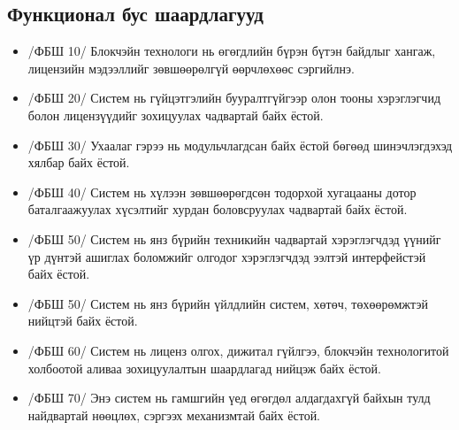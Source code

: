 \subsection{Функционал бус шаардлагууд}
\begin{itemize}
   \item[] /ФБШ 10/ Блокчэйн технологи нь өгөгдлийн бүрэн бүтэн байдлыг хангаж, лицензийн мэдээллийг зөвшөөрөлгүй өөрчлөхөөс сэргийлнэ.
   \item[] /ФБШ 20/ Систем нь гүйцэтгэлийн бууралтгүйгээр олон тооны хэрэглэгчид болон лицензүүдийг зохицуулах чадвартай байх ёстой.
   \item[] /ФБШ 30/ Ухаалаг гэрээ нь модульчлагдсан байх ёстой бөгөөд шинэчлэгдэхэд хялбар байх ёстой.
   \item[] /ФБШ 40/ Систем нь хүлээн зөвшөөрөгдсөн тодорхой хугацааны дотор баталгаажуулах хүсэлтийг хурдан боловсруулах чадвартай байх ёстой.
   \item[] /ФБШ 50/ Систем нь янз бүрийн техникийн чадвартай хэрэглэгчдэд үүнийг үр дүнтэй ашиглах боломжийг олгодог хэрэглэгчдэд ээлтэй интерфейстэй байх ёстой.
   \item[] /ФБШ 50/ Систем нь янз бүрийн үйлдлийн систем, хөтөч, төхөөрөмжтэй нийцтэй байх ёстой.
   \item[] /ФБШ 60/ Систем нь лиценз олгох, дижитал гүйлгээ, блокчэйн технологитой холбоотой аливаа зохицуулалтын шаардлагад нийцэж байх ёстой.
   \item[] /ФБШ 70/ Энэ систем нь гамшгийн үед өгөгдөл алдагдахгүй байхын тулд найдвартай нөөцлөх, сэргээх механизмтай байх ёстой.
\end{itemize}

\newpage
